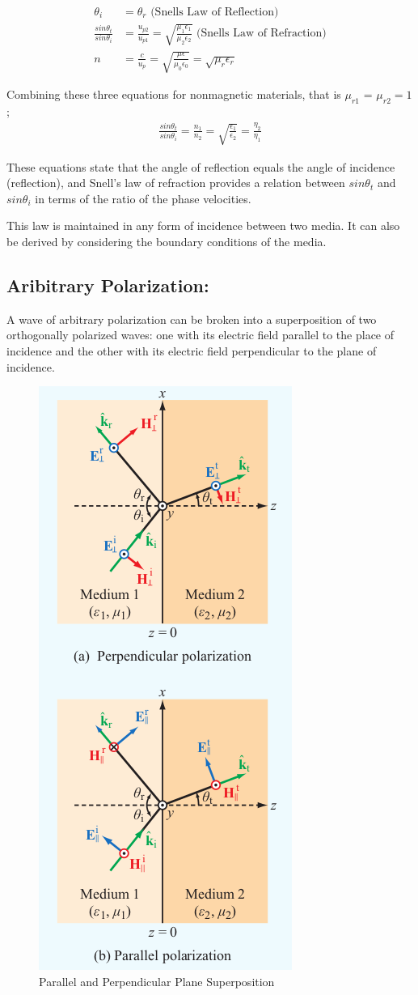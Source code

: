 \documentclass{book}
\begin{document}
\begin{align*}
	\theta_i &= \theta_r  \text{ (Snells Law of Reflection)}\\
	\frac{sin \theta_t}{sin \theta_i} &= \frac{u_{p2}}{u_{p1}} = \sqrt{ \frac{\mu_1 \epsilon_1}{\mu_2 \epsilon_2}} \text{  (Snells Law of Refraction)} \\
	n &= \frac{c}{u_p} = \sqrt{\frac{\mu \epsilon}{\mu_0 \epsilon_0}} = \sqrt{\mu_r \epsilon_r}
\end{align*}

Combining these three equations for nonmagnetic materials, that is $\mu_{r1}$ = $\mu_{r2} = 1$;
\begin{align*}
	\frac{sin\theta_t}{sin\theta_i} = \frac{n_1}{n_2} = \sqrt{ \frac{ \epsilon_1}{\epsilon_2}} = \frac{\eta_2}{\eta_1} 
\end{align*}

These equations state that the angle of reflection equals the angle of incidence (reflection), and Snell's law of refraction provides a relation between $sin\theta_t$ and $sin\theta_i$ in terms of the ratio of the phase velocities.

This law is maintained in any form of incidence between two media. It can also be derived by considering the boundary conditions of the media.

\subsection{Aribitrary Polarization:}

A wave of arbitrary polarization can be broken into a superposition of two orthogonally polarized waves: one with its electric field parallel to the place of incidence and the other with its electric field perpendicular to the plane of incidence. 

\begin{figure}[h]
	\centering
	\includegraphics[width=0.2\linewidth]{Screenshots/incident_planes}
	\caption{Parallel and Perpendicular Plane Superposition}
	\label{fig:incidentplanes}
\end{figure}
\end{document}
